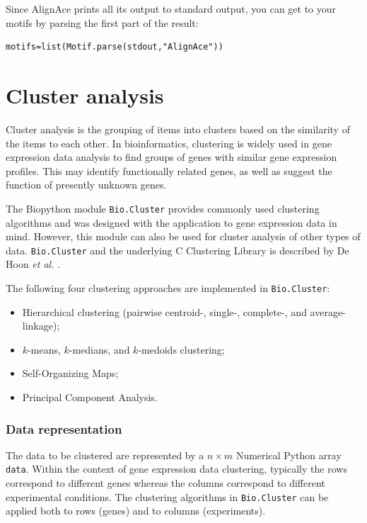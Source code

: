 \documentclass{report}
\begin{document}
Since AlignAce prints all its output to standard output, you can get
to your motifs by parsing the first part of the result:
\begin{verbatim}
motifs=list(Motif.parse(stdout,"AlignAce"))
\end{verbatim}


\chapter{Cluster analysis}

Cluster analysis is the grouping of items into clusters based on the similarity of the items to each other. In bioinformatics, clustering is widely used in gene expression data analysis to find groups of genes with similar gene expression profiles. This may identify functionally related genes, as well as suggest the function of presently unknown genes.

The Biopython module \verb|Bio.Cluster| provides commonly used clustering algorithms and was designed with the application to gene expression data in mind. However, this module can also be used for cluster analysis of other types of data. \verb|Bio.Cluster| and the underlying C Clustering Library is described by De Hoon \textit{et al.} \cite{dehoon2004}.

The following four clustering approaches are implemented in \verb|Bio.Cluster|:
\begin{itemize}
\item
Hierarchical clustering (pairwise centroid-, single-, complete-, and average-linkage);
\item
$k$-means, $k$-medians, and $k$-medoids clustering;
\item
Self-Organizing Maps;
\item
Principal Component Analysis.
\end{itemize}

\subsection*{Data representation}

The data to be clustered are represented by a $n \times m$ Numerical Python array \verb|data|. Within the context of gene expression data clustering, typically the rows correspond to different genes whereas the columns correspond to different experimental conditions. The clustering algorithms in \verb|Bio.Cluster| can be applied both to rows (genes) and to columns (experiments).
\end{document}

